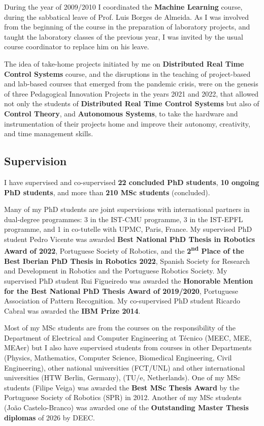 During the year of 2009/2010 I coordinated the \textbf{Machine Learning}
course, during the sabbatical leave of Prof. Luis Borges de Almeida. As
I was involved from the beginning of the course in the preparation of
laboratory projects, and taught the laboratory classes of the previous
year, I was invited by the usual course coordinator to replace him on
his leave.

The idea of take-home projects initiated by me on \textbf{Distributed
Real Time Control Systems} course, and the disruptions in the teaching
of project-based and lab-based courses that emerged from the pandemic
crisis, were on the genesis of three Pedagogical Innovation Projects in
the years 2021 and 2022, that allowed not only the students of
\textbf{Distributed Real Time Control Systems} but also of
\textbf{Control Theory}, and \textbf{Autonomous Systems}, to take the
hardware and instrumentation of their projects home and improve their
autonomy, creativity, and time management skills.

\subsection{Supervision}\label{supervision}

I have supervised and co-supervised \textbf{22 concluded PhD students},
\textbf{10 ongoing PhD students}, and more than \textbf{210 MSc
students} (concluded).

Many of my PhD students are joint supervisions with international
partners in dual-degree programmes: 3 in the IST-CMU programme, 3 in the
IST-EPFL programme, and 1 in co-tutelle with UPMC, Paris, France. My
supervised PhD student Pedro Vicente was awarded \textbf{Best National
PhD Thesis in Robotics Award of 2022}, Portuguese Society of Robotics,
and the \textbf{2\textsuperscript{nd} Place of the Best Iberian PhD
Thesis in Robotics 2022}, Spanish Society for Research and Development
in Robotics and the Portuguese Robotics Society. My supervised PhD
student Rui Figueiredo was awarded the \textbf{Honorable Mention for the
Best National PhD Thesis Award of 2019/2020}, Portuguese Association of
Pattern Recognition. My co-supervised PhD student Ricardo Cabral was
awarded the \textbf{IBM Prize 2014}.

Most of my MSc students are from the courses on the responsibility of
the Department of Electrical and Computer Engineering at Técnico (MEEC,
MEE, MEAer) but I also have supervised students from courses in other
Departments (Physics, Mathematics, Computer Science, Biomedical
Engineering, Civil Engineering), other national universities (FCT/UNL)
and other international universities (HTW Berlin, Germany), (TU/e,
Netherlands). One of my MSc students (Filipe Veiga) was awarded the
\textbf{Best MSc Thesis Award} by the Portuguese Society of Robotics
(SPR) in 2012. Another of my MSc students (João Castelo-Branco) was
awarded one of the \textbf{Outstanding Master Thesis diplomas} of 2026
by DEEC.

